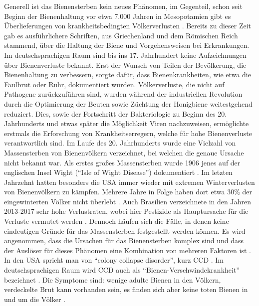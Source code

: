 Generell ist das Bienensterben kein neues Phänomen, im Gegenteil, schon seit Beginn der Bienenhaltung vor etwa 7.000 Jahren in Mesopotamien gibt es Überlieferungen von krankheitsbedingten Völkerverlusten \citep{flugel2015}. Bereits zu dieser Zeit gab es ausführlichere Schriften, aus Griechenland und dem Römischen Reich stammend, über die Haltung der Biene und Vorgehensweisen bei Erkrankungen. Im deutschsprachigen Raum sind bis ins 17. Jahrhundert keine Aufzeichnungen über Bienenverluste bekannt. Erst der Wunsch von Teilen der Bevölkerung, die Bienenhaltung zu verbessern, sorgte dafür, dass Bienenkrankheiten, wie etwa die Faulbrut oder Ruhr, dokumentiert wurden. Völkerverluste, die nicht auf Pathogene zurückzuführen sind, wurden während der industriellen Revolution durch die Optimierung der Beuten sowie Züchtung der Honigbiene weitestgehend reduziert. Dies, sowie der Fortschritt der Bakteriologie zu Beginn des 20. Jahrhunderts und etwas später die Möglichkeit Viren nachzuweisen, ermöglichte erstmals die Erforschung von Krankheitserregern, welche für hohe Bienenverluste verantwortlich sind. Im Laufe des 20. Jahrhunderts wurde eine Vielzahl von Massensterben von Bienenvölkern verzeichnet, bei welchen die genaue Ursache nicht bekannt war. Als erstes großes Massensterben wurde 1906 jenes auf der englischen Insel Wight (\enquote{Isle of Wight Disease}) dokumentiert \citep{neumann2009, flugel2015}.
\newline
Im letzten Jahrzehnt hatten besonders die USA immer wieder mit extremen Winterverlusten von Bienenvölkern zu kämpfen. Mehrere Jahre in Folge haben dort etwa 30\% der eingewinterten Völker nicht überlebt \citep{lee2015, steinhauer2014, vanengelsdorp2008, vanengelsdorp2007, vanengelsdorp2010, vanengelsdorp2011}. Auch Brasilien verzeichnete in den Jahren 2013-2017 sehr hohe Verlustraten, wobei hier Pestizide als Hauptursache für die Verluste vermutet werden \citep{castilhos2019}. Dennoch häufen sich die Fälle, in denen keine eindeutigen Gründe für das Massensterben festgestellt werden können. Es wird angenommen, dass die Ursachen für das Bienensterben komplex sind und dass der Auslöser für dieses Phänomen eine Kombination von mehreren Faktoren ist \citep{moritz2010, brodschneider2013, steinhauer2014, belsky2019}. In den USA spricht man von \enquote{colony collapse disorder}, kurz CCD \citep{vanengelsdorp2009, williams2010}. Im deutschsprachigen Raum wird CCD auch als \enquote{Bienen-Verschwindekrankheit} bezeichnet \citep{flugel2015}. Die Symptome sind: wenige adulte Bienen in den Völkern, verdeckelte Brut kann vorhanden sein, es finden sich aber keine toten Bienen in und um die Völker \citep{vanengelsdorp2009}.
